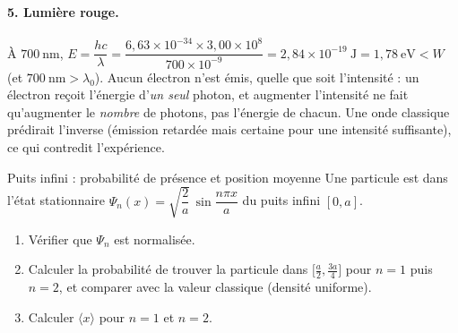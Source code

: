\begin{correction}
\paragraph{5. Lumière rouge.} À $700\ \mathrm{nm}$,
$E=\dfrac{hc}{\lambda}=\dfrac{6{,}63\times10^{-34}\times3{,}00\times10^{8}}{700\times10^{-9}}
=2{,}84\times10^{-19}\ \mathrm{J}=1{,}78\ \mathrm{eV}<W$ (et $700\ \mathrm{nm}>\lambda_0$). Aucun électron n'est
émis, quelle que soit l'intensité : un électron reçoit l'énergie d'\emph{un seul} photon, et
augmenter l'intensité ne fait qu'augmenter le \emph{nombre} de photons, pas l'énergie de chacun. Une
onde classique prédirait l'inverse (émission retardée mais certaine pour une intensité suffisante),
ce qui contredit l'expérience.
\end{correction}

\begin{exercice}{Puits infini : probabilité de présence et position moyenne}\label{ex:probapuits}
Une particule est dans l'état stationnaire $\Psi_n(x)=\sqrt{\dfrac2a}\,\sin\dfrac{n\pi x}{a}$ du
puits infini $[0,a]$.
\begin{enumerate}[label=\arabic*.,nosep]
  \item Vérifier que $\Psi_n$ est normalisée.
  \item Calculer la probabilité de trouver la particule dans $\big[\tfrac a2,\tfrac{3a}4\big]$ pour
        $n=1$ puis $n=2$, et comparer avec la valeur classique (densité uniforme).
  \item Calculer $\langle x\rangle$ pour $n=1$ et $n=2$.
\end{enumerate}
\end{exercice}
